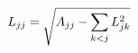 \documentclass[preview]{standalone}
\begin{document}
\begin{align*}
\special{dvisvgm:raw <g id='unique000'>}L_{jj} = \sqrt{A_{jj} - \sum_{k<j}L_{jk}^2}\special{dvisvgm:raw </g>}
\end{align*}
\end{document}
